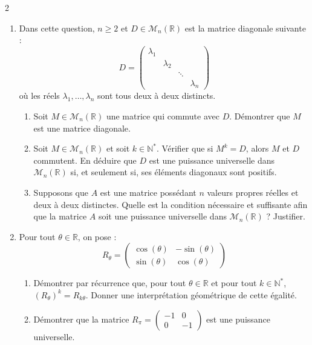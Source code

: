 \documentclass{article}
\begin{document}
\begin{paracol}{2}
{\begin{enumerate}
    \item Dans cette question, $n \geq 2$ et $D \in \mathcal{M}_n(\mathbb{R})$ est la matrice diagonale suivante :
    \[
    D = \begin{pmatrix} \lambda_1 & & \\ & \lambda_2 & & \\ & & \ddots & \\ & & & \lambda_n \end{pmatrix}
    \]
    où les réels $\lambda_1, \dots, \lambda_n$ sont tous deux à deux distincts.
    \begin{enumerate}
        \item Soit $M \in \mathcal{M}_n(\mathbb{R})$ une matrice qui commute avec $D$. Démontrer que $M$ est une matrice diagonale.
        \item Soit $M \in \mathcal{M}_n(\mathbb{R})$ et soit $k \in \mathbb{N}^*$. Vérifier que si $M^k = D$, alors $M$ et $D$ commutent. En déduire que $D$ est une puissance universelle dans $\mathcal{M}_n(\mathbb{R})$ si, et seulement si, ses éléments diagonaux sont positifs.
        \item Supposons que $A$ est une matrice possédant $n$ valeurs propres réelles et deux à deux distinctes. Quelle est la condition nécessaire et suffisante afin que la matrice $A$ soit une puissance universelle dans $\mathcal{M}_n(\mathbb{R})$ ? Justifier.
    \end{enumerate}
    \switchcolumn
    
    \setcounter{enumi}{6}
    \item Pour tout $\theta \in \mathbb{R}$, on pose :
    \[
    R_\theta = \begin{pmatrix} \cos(\theta) & -\sin(\theta) \\ \sin(\theta) & \cos(\theta) \end{pmatrix}
    \]
    \begin{enumerate}
        \item Démontrer par récurrence que, pour tout $\theta \in \mathbb{R}$ et pour tout $k \in \mathbb{N}^*$, $(R_\theta)^k = R_{k\theta}$. Donner une interprétation géométrique de cette égalité.
        \item Démontrer que la matrice $R_\pi = \begin{pmatrix} -1 & 0 \\ 0 & -1 \end{pmatrix}$ est une puissance universelle.
    \end{enumerate}


\end{enumerate}}
\end{paracol}
\end{document}
